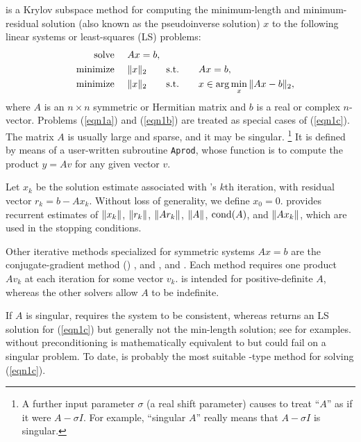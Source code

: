 \documentclass{doc_acmtrans2m}
\begin{document}
\MINRESQLP \cite{C06,CPS11} is a Krylov subspace method for computing
the minimum-length and minimum-residual solution (also known as the
pseudoinverse solution) $x$ to the following linear systems or
least-squares (LS) problems:
\begin{align}
     \text{solve }    & Ax = b,
     \label{eqn1a}
  \\ \text{minimize } & \norm{x}_2 \quad \text{s.t.} \quad
                        Ax = b,
     \label{eqn1b}
  \\ \text{minimize } & \norm{x}_2  \quad
                        \text{s.t.} \quad
                        x \in \arg\min_x \norm{Ax-b}_2,
      \label{eqn1c}
\end{align}
where $A$ is an $n \times n$ symmetric or Hermitian matrix and $b$ is
a real or complex $n$-vector.  Problems (\ref{eqn1a}) and
(\ref{eqn1b}) are treated as special cases of (\ref{eqn1c}).  The
matrix $A$ is usually large and sparse, and it may be singular.%
\footnote{A further input parameter $\sigma$ (a real shift
  parameter) causes \MINRESQLP to treat ``$A$'' as if it were
  $A-\sigma I$.  For example, ``singular $A$'' really means that
  $A-\sigma I$ is singular.}  It is defined by means of a user-written
subroutine \texttt{Aprod},
whose function is to compute the product $y=Av$ for any given vector
$v$.


Let $x_k$ be the solution estimate associated with \MINRESQLP's $k$th
iteration, with residual vector $r_k = b - Ax_k$.  Without loss of
generality, we define $x_0 = 0$.  \MINRESQLP provides recurrent
estimates of $\norm{x_k}$, $\norm{r_k}$, $\norm{Ar_k}$, $\norm{A}$,
$\cond(A)$, and $\norm{Ax_k}$, which are used in the stopping
conditions.

Other iterative methods specialized for symmetric systems $Ax=b$ are
the conjugate-gradient method (\CG) \cite{HS52}, \SYMMLQ and \MINRES
\cite{PS75}, and \SQMR \cite{FN94}.  Each method requires one product
$Av_k$ at each iteration for some vector $v_k$.  \CG is intended for
positive-definite $A$, whereas the other solvers allow $A$ to be
indefinite.

If $A$ is singular, \SYMMLQ requires the system to be consistent,
whereas \MINRES returns an LS solution for (\ref{eqn1c}) but generally
not the min-length solution; see \cite{C06,CPS11} for examples.  \SQMR
without preconditioning is mathematically equivalent to \MINRES but
could fail on a singular problem.  To date, \MINRESQLP is probably the
most suitable \CG-type method for solving (\ref{eqn1c}).
\end{document}

